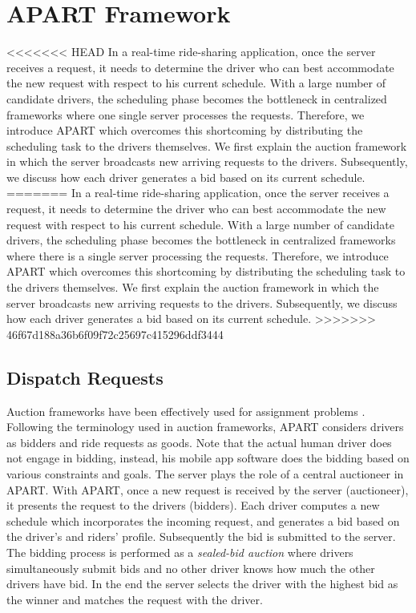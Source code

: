 \vspace{-4mm}
\section{APART Framework}
\vspace{-1mm}
\label{sec:framework}

<<<<<<< HEAD
In a real-time ride-sharing application, once the server receives a request, it needs to determine the driver who can best accommodate the new request with respect to his current schedule. With a large number of candidate drivers, the scheduling phase becomes the bottleneck in centralized frameworks where one single server processes the requests. Therefore, we introduce APART which overcomes this shortcoming by distributing the scheduling task to the drivers themselves. We first explain the auction framework in which the server broadcasts new arriving requests to the drivers. Subsequently, we discuss how each driver generates a bid based on its current schedule.
=======
In a real-time ride-sharing application, once the server receives a request, it needs to determine the driver who can best accommodate the new request with respect to his current schedule. With a large number of candidate drivers, the scheduling phase becomes the bottleneck in centralized frameworks where there is a single server processing the requests. Therefore, we introduce APART which overcomes this shortcoming by distributing the scheduling task to the drivers themselves. We first explain the auction framework in which the server broadcasts new arriving requests to the drivers. Subsequently, we discuss how each driver generates a bid based on its current schedule.
>>>>>>> 46f67d188a36b6f09f72c25697c415296ddf3444

\subsection{Dispatch Requests}
\label{subsec:dispatch}
Auction frameworks have been effectively used for assignment problems \cite{Lagoudakis04,Mehta05}. Following the terminology used in auction frameworks, APART considers drivers as bidders and ride requests as goods. Note that the actual human driver does not engage in bidding, instead, his mobile app software does the bidding based on various constraints and goals. The server plays the role of a central auctioneer in APART. With APART, once a new request is received by the server (auctioneer), it presents the request to the drivers (bidders). Each driver computes a new schedule which incorporates the incoming request, and generates a bid based on the driver's and riders' profile. Subsequently the bid is submitted to the server. The bidding process is performed as a \textit{sealed-bid auction} where drivers simultaneously submit bids and no other driver knows how much the other drivers have bid. In the end the server selects the driver with the highest bid as the winner and matches the request with the driver.

